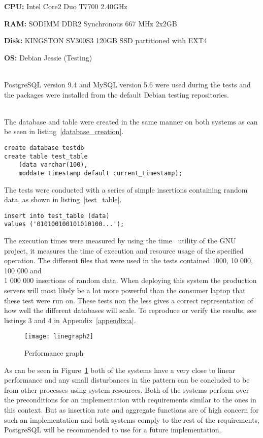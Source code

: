\documentclass[a4paper,12pt]{article}
\begin{document}
\vspace{0.25in}
\textbf{CPU:} Intel Core2 Duo T7700 2.40GHz 

\textbf{RAM:} SODIMM DDR2 Synchronous 667 MHz 2x2GB

\textbf{Disk:} KINGSTON SV300S3 120GB SSD partitioned with EXT4

\textbf{OS:} Debian Jessie (Testing)

~\\
PostgreSQL version 9.4 and MySQL version 5.6 were used during the tests and the packages were installed from the default Debian testing repositories.

~\\
The database and table were created in the same manner on both systems as can be seen in listing~\ref{database_creation}.
\begin{lstlisting}[label=database_creation,caption=Database and table creation]
create database testdb
create table test_table 
    (data varchar(100), 
    moddate timestamp default current_timestamp);
\end{lstlisting}

The tests were conducted with a series of simple insertions containing random data, as shown in listing~\ref{test_table}.
\begin{lstlisting}[label=test_table,caption=Example insertion]
insert into test_table (data) 
values ('010100100101010100...');
\end{lstlisting}

The execution times were measured by using the time~\cite{TIME} utility of the GNU project, it measures the time of execution and resource usage of the specified operation. 
The different files that were used in the tests contained 1000, 10 000, 100 000 and \\1 000 000 insertions of random data. 
When deploying this system the production servers will most likely be a lot more powerful than the consumer laptop that these test were run on.
These tests non the less gives a correct representation of how well the different databases will scale. 
To reproduce or verify the results, see listings 3 and 4 in Appendix~\ref{appendix:a}.

\begin{figure}[h!]
    \vspace{0.25in}
    \centerline{\texttt{[image: linegraph2]}}
    \caption{Performance graph}
    \label{fig:vs}
\end{figure}

As can be seen in Figure~\ref{fig:vs} both of the systems have a very close to linear performance and any small disturbances in the pattern can be concluded to be from other processes using system resources.
Both of the systems perform over the preconditions for an implementation with requirements similar to the ones in this context. But as insertion rate and aggregate functions are of high concern for such 
an implementation and both systems comply to the rest of the requirements, PostgreSQL will be recommended to use for a future implementation.
\end{document}
